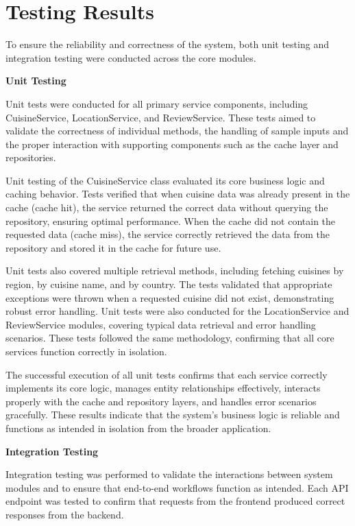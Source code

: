 \section{Testing Results}
To ensure the reliability and correctness of the system, both unit testing 
and integration testing were conducted across the core modules.

\textbf{Unit Testing}

Unit tests were conducted for all primary service components, including 
CuisineService, LocationService, and ReviewService. 
These tests aimed to validate the correctness of individual methods, 
the handling of sample inputs and the proper 
interaction with supporting components such as the cache layer and repositories.

Unit testing of the CuisineService class evaluated its core business logic and caching behavior.
Tests verified that when cuisine data was already present in the cache 
(cache hit), the service returned the correct data without querying the repository, 
ensuring optimal performance. When the cache did not contain the requested data 
(cache miss), the service correctly retrieved the data from the repository and 
stored it in the cache for future use. 

Unit tests also covered multiple retrieval methods, including fetching cuisines 
by region, by cuisine name, and by country. The tests validated 
that appropriate exceptions were thrown when a requested cuisine did not exist, 
demonstrating robust error handling.
Unit tests were also conducted for the LocationService and ReviewService modules,
covering typical data retrieval and error handling scenarios.
These tests followed the same methodology, confirming that all core services function correctly in isolation.

The successful execution of all unit tests confirms that each service correctly 
implements its core logic, manages entity relationships effectively, interacts 
properly with the cache and repository layers, and handles error scenarios gracefully. 
These results indicate that the system's business logic is reliable and functions 
as intended in isolation from the broader application.

\textbf{Integration Testing}

Integration testing was performed to validate the interactions between system modules 
and to ensure that end-to-end workflows function as intended. Each API endpoint was 
tested to confirm that requests from the frontend produced correct responses from the backend.

